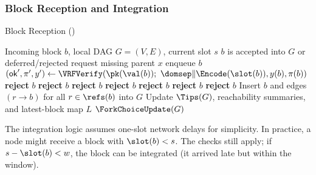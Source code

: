 \subsubsection{Block Reception and Integration}
\begin{algorithm}[htbp!]
\caption{Block Reception (\ProjBase)}
\label{alg:block-reception}
\begin{algorithmic}[1]
\Require Incoming block $b$, local DAG $G=(V,E)$, current slot $s$
\Ensure $b$ is accepted into $G$ or deferred/rejected
 \Return \EndIf
{}
      \State request missing parent $x$
   \EndFor
   \State enqueue $b$ 
   \State \Return
\EndIf
\State $(\mathsf{ok}',\pi',y') \gets \VRFVerify(\pk(\val(b));\ \domsep\|\Encode(\slot(b)), y(b), \pi(b))$
  \State \textbf{reject} $b$ 
\EndIf
{}
   \State \textbf{reject} $b$ 
\EndIf
{} 
  \State \textbf{reject} $b$ 
\EndIf
{}
  \State \textbf{reject} $b$ 
\EndIf
{}
  \State \textbf{reject} $b$ 
\EndIf
{}
  \State \textbf{reject} $b$ %
\EndIf
{}
  \State \textbf{reject} $b$ 
\EndIf
\State Insert $b$ and edges $(r \to b)$ for all $r\in\refs(b)$ into $G$
\State Update $\Tips(G)$, reachability summaries, and latest-block map $L$
\State $\ForkChoiceUpdate(G)$
\end{algorithmic}
\end{algorithm}

\begin{remark}
The integration logic assumes one-slot network delays for simplicity. In practice, a node might receive a block with $\slot(b) < s$. The checks still apply; if $s-\slot(b) < w$, the block can be integrated (it arrived late but within the window).
\end{remark}

